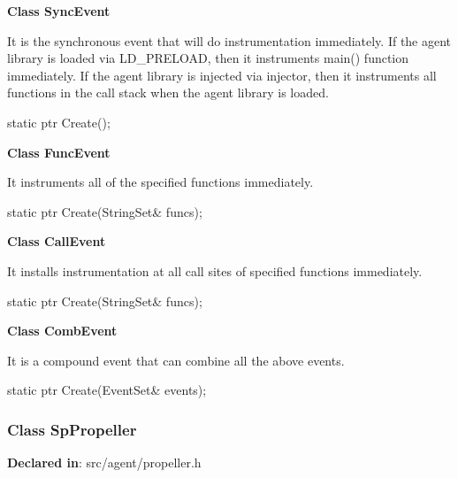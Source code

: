 \textbf{Class SyncEvent}

It is the synchronous event that will do instrumentation immediately.
If the agent library is loaded via LD\_PRELOAD, then it instruments main()
function immediately.
If the agent library is injected via injector, then it instruments all functions
in the call stack when the agent library is loaded.

\begin{apient}
static ptr Create();
\end{apient}

\textbf{Class FuncEvent}

It instruments all of the specified functions immediately.

\begin{apient}
static ptr Create(StringSet& funcs);
\end{apient}

\textbf{Class CallEvent}

It installs instrumentation at all call sites of specified functions immediately.

\begin{apient}
static ptr Create(StringSet& funcs);
\end{apient}

\textbf{Class CombEvent}

It is a compound event that can combine all the above events.

\begin{apient}
static ptr Create(EventSet& events);
\end{apient}

\subsubsection{Class SpPropeller}
\textbf{Declared in}: src/agent/propeller.h

